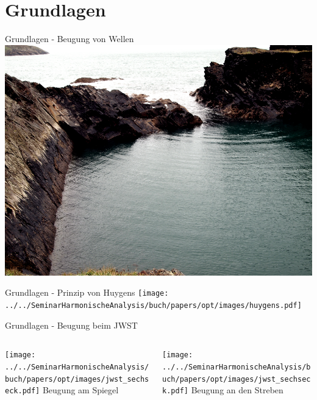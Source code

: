 \section{Grundlagen}

\begin{frame}{Grundlagen - Beugung von Wellen}
    \centering
    \includegraphics[width=0.9\linewidth]{images/beugung_von_wasserwellen.png}
\end{frame}

\begin{frame}{Grundlagen - Prinzip von Huygens}
    \texttt{[image: ../../SeminarHarmonischeAnalysis/buch/papers/opt/images/huygens.pdf]}
\end{frame}

\begin{frame}{Grundlagen - Beugung beim JWST}
    \begin{columns}
        \begin{column}{0.5\textwidth}
            \centering
            \texttt{[image: ../../SeminarHarmonischeAnalysis/buch/papers/opt/images/jwst\_sechseck.pdf]}
            Beugung am Spiegel
        \end{column}
        \pause
        \begin{column}{0.5\textwidth}
            \centering
            \texttt{[image: ../../SeminarHarmonischeAnalysis/buch/papers/opt/images/jwst\_sechseck.pdf]}
            Beugung an den Streben
        \end{column}
    \end{columns}
\end{frame}

\begin{frame}[plain]
\end{frame}

